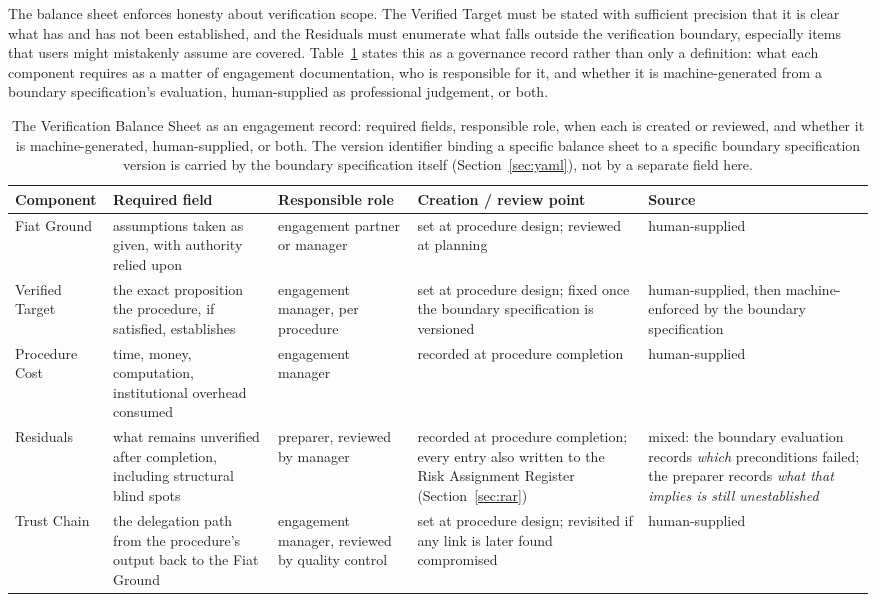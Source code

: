 \documentclass[11pt,a4paper]{article}
\theoremstyle{definition}
\theoremstyle{remark}
\begin{document}
The balance sheet enforces honesty about verification scope. The Verified Target must be stated with sufficient precision that it is clear what has and has not been established, and the Residuals must enumerate what falls outside the verification boundary, especially items that users might mistakenly assume are covered. Table~\ref{tab:vbsfields} states this as a governance record rather than only a definition: what each component requires as a matter of engagement documentation, who is responsible for it, and whether it is machine-generated from a boundary specification's evaluation, human-supplied as professional judgement, or both.

\begin{table}[htbp]
\centering
\small
\begin{tabular}{>{\raggedright\arraybackslash}p{1.8cm}>{\raggedright\arraybackslash}p{2.6cm}>{\raggedright\arraybackslash}p{2.6cm}>{\raggedright\arraybackslash}p{2.6cm}>{\raggedright\arraybackslash}p{2.2cm}}
\toprule
\textbf{Component} & \textbf{Required field} & \textbf{Responsible role} & \textbf{Creation / review point} & \textbf{Source} \\
\midrule
Fiat Ground & assumptions taken as given, with authority relied upon & engagement partner or manager & set at procedure design; reviewed at planning & human-supplied \\
\addlinespace
Verified Target & the exact proposition the procedure, if satisfied, establishes & engagement manager, per procedure & set at procedure design; fixed once the boundary specification is versioned & human-supplied, then machine-enforced by the boundary specification \\
\addlinespace
Procedure Cost & time, money, computation, institutional overhead consumed & engagement manager & recorded at procedure completion & human-supplied \\
\addlinespace
Residuals & what remains unverified after completion, including structural blind spots & preparer, reviewed by manager & recorded at procedure completion; every entry also written to the Risk Assignment Register (Section~\ref{sec:rar}) & mixed: the boundary evaluation records \emph{which} preconditions failed; the preparer records \emph{what that implies is still unestablished} \\
\addlinespace
Trust Chain & the delegation path from the procedure's output back to the Fiat Ground & engagement manager, reviewed by quality control & set at procedure design; revisited if any link is later found compromised & human-supplied \\
\bottomrule
\end{tabular}
\caption{The Verification Balance Sheet as an engagement record: required fields, responsible role, when each is created or reviewed, and whether it is machine-generated, human-supplied, or both. The version identifier binding a specific balance sheet to a specific boundary specification version is carried by the boundary specification itself (Section~\ref{sec:yaml}), not by a separate field here.}
\label{tab:vbsfields}
\end{table}
\end{document}

